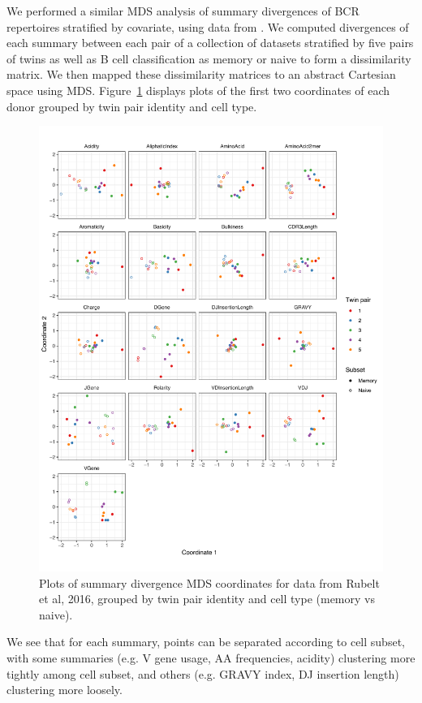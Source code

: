 \documentclass{article}
\begin{document}
We performed a similar MDS analysis of summary divergences of BCR repertoires stratified by covariate, using data from \cite{Rubelt2016-tl}.
We computed divergences of each summary between each pair of a collection of datasets stratified by five pairs of twins as well as B cell classification as memory or naive to form a dissimilarity matrix.
We then mapped these dissimilarity matrices to an abstract Cartesian space using MDS.
Figure~\ref{fig:BCR_MDS} displays plots of the first two coordinates of each donor grouped by twin pair identity and cell type.
\begin{figure}
    \includegraphics[width=\linewidth]{Figures/bcr_pca.pdf}
    \caption{Plots of summary divergence MDS coordinates for data from Rubelt et al, 2016, grouped by twin pair identity and cell type (memory vs naive).}
    \label{fig:BCR_MDS}
\end{figure}
We see that for each summary, points can be separated according to cell subset, with some summaries (e.g. V gene usage, AA frequencies, acidity) clustering more tightly among cell subset, and others (e.g. GRAVY index, DJ insertion length) clustering more loosely.
\end{document}
